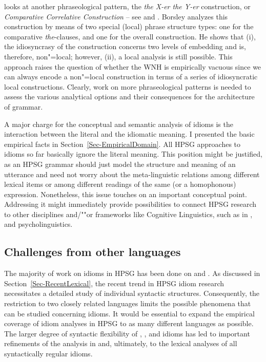 \documentclass[output=paper
 	        ,biblatex
                ,babelshorthands
                ,newtxmath
                ,draftmode
                ,colorlinks, citecolor=brown
]{langscibook}
\begin{document}
\citet{Borsley2004a} looks at another phraseological pattern, the \emph{the X-er the Y-er}
construction, or \emph{Comparative Correlative Construction} -- see
 and
\crossrefchapterw[\pageref{udc:page-correlatives-start}--\pageref{udc:page-correlatives-end}]{udc}.
Borsley analyzes this construction by means of two special (local) phrase structure types: one for
the comparative \emph{the}-clauses, and one for the overall construction. He shows that (i), the
idiosyncrasy of the construction concerns two levels of embedding and is, therefore, non"=local;
however, (ii), a local analysis is still possible. This approach raises the question of whether the
WNH is empirically vacuous since we can always encode a non"=local construction in terms of a series
of idiosyncratic local constructions.  Clearly, work on more phraseological patterns is needed to
assess the various analytical options and their consequences for the architecture of grammar.

A major charge for the conceptual and semantic analysis of idioms is the interaction between the
literal and the idiomatic meaning.  I presented the basic empirical facts in
Section~\ref{Sec-EmpiricalDomain}.  All HPSG approaches to idioms so far basically ignore the
literal meaning.  This position might be justified, as an HPSG grammar should just model the
structure and meaning of an utterance and need not worry about the meta-linguistic relations among
different lexical items or among different readings of the same (or a homophonous) expression.
Nonetheless, this issue touches on an important conceptual point.  Addressing it might immediately
provide possibilities to connect HPSG research to other disciplines and/""or frameworks like
Cognitive Linguistics, such as in \citet{Dobrovolskij:Piirainen:05}, and psycholinguistics.



\subsection{Challenges from other languages}
\label{Sec-OtherLanguages}

The majority of work on idioms in HPSG has been done on  and . 
As discussed in Section~\ref{Sec-RecentLexical}, the recent trend in HPSG idiom research necessitates a detailed study of individual syntactic structures. 
Consequently, the restriction to two closely related languages limits the possible phenomena that can be studied concerning idioms. 
It would be essential to expand the empirical coverage of idiom analyses in HPSG to as many different languages as possible. 
The larger degree of syntactic flexibility of , , and  idioms \citep{Ruwet:91,NSW94a,Schenk:95} has led to important refinements of the analysis in \citet{NSW94a} and, ultimately, to the lexical analyses of all syntactically regular idioms. 
\end{document}
